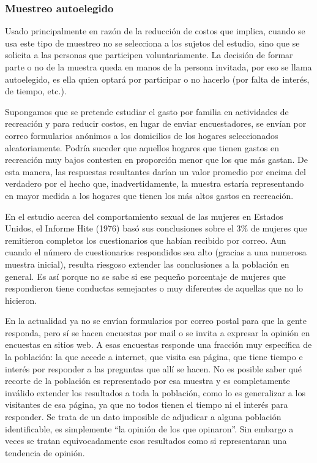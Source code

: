 \documentclass[]{article}
\begin{document}
\hypertarget{muestreo-autoelegido}{%
\subsubsection{Muestreo autoelegido}\label{muestreo-autoelegido}}

Usado principalmente en razón de la reducción de costos que implica,
cuando se usa este tipo de muestreo no se selecciona a los sujetos del
estudio, sino que se solicita a las personas que participen
voluntariamente. La decisión de formar parte o no de la muestra queda en
manos de la persona invitada, por eso se llama autoelegido, es ella
quien optará por participar o no hacerlo (por falta de interés, de
tiempo, etc.).

Supongamos que se pretende estudiar el gasto por familia en actividades
de recreación y para reducir costos, en lugar de enviar encuestadores,
se envían por correo formularios anónimos a los domicilios de los
hogares seleccionados aleatoriamente. Podría suceder que aquellos
hogares que tienen gastos en recreación muy bajos contesten en
proporción menor que los que más gastan. De esta manera, las respuestas
resultantes darían un valor promedio por encima del verdadero por el
hecho que, inadvertidamente, la muestra estaría representando en mayor
medida a los hogares que tienen los más altos gastos en recreación.

En el estudio acerca del comportamiento sexual de las mujeres en Estados
Unidos, el Informe Hite (1976) basó sus conclusiones sobre el 3\% de
mujeres que remitieron completos los cuestionarios que habían recibido
por correo. Aun cuando el número de cuestionarios respondidos sea alto
(gracias a una numerosa muestra inicial), resulta riesgoso extender las
conclusiones a la población en general. Es así porque no se sabe si ese
pequeño porcentaje de mujeres que respondieron tiene conductas
semejantes o muy diferentes de aquellas que no lo hicieron.

En la actualidad ya no se envían formularios por correo postal para que
la gente responda, pero sí se hacen encuestas por mail o se invita a
expresar la opinión en encuestas en sitios web. A esas encuestas
responde una fracción muy específica de la población: la que accede a
internet, que visita esa página, que tiene tiempo e interés por
responder a las preguntas que allí se hacen. No es posible saber qué
recorte de la población es representado por esa muestra y es
completamente inválido extender los resultados a toda la población, como
lo es generalizar a los visitantes de esa página, ya que no todos tienen
el tiempo ni el interés para responder. Se trata de un dato imposible de
adjudicar a alguna población identificable, es simplemente ``la opinión
de los que opinaron''. Sin embargo a veces se tratan equivocadamente esos
resultados como si representaran una tendencia de opinión.
\end{document}
